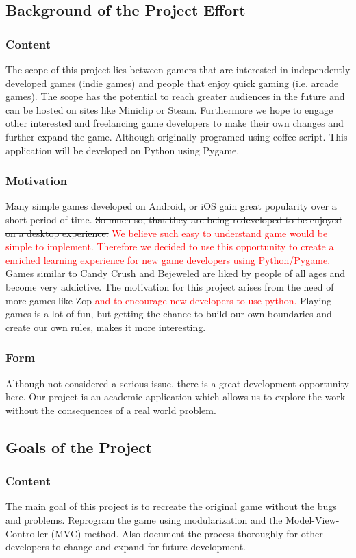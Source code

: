 \documentclass[12pt]{article}
\begin{document}
\subsection{Background of the Project Effort}
\subsubsection{Content}
 The scope of this project lies between gamers that are interested in independently developed games (indie games) and people that enjoy quick gaming (i.e. arcade games). The scope has the potential to reach greater audiences in the future and can be hosted on sites like Miniclip or Steam. Furthermore we hope to engage other interested and freelancing game developers to make their own changes and further expand the game. Although originally programed using coffee script. This application will be developed on Python using Pygame.
\subsubsection{Motivation}
 Many simple games developed on Android, or iOS gain great popularity over a short period of time.\st{ So much so, that they are being redeveloped to be enjoyed on a desktop experience.} \textcolor{red}{ We believe such easy to understand game would be simple to implement.  Therefore we decided to use this opportunity to create a enriched learning experience for new game developers using Python/Pygame.} Games similar to Candy Crush and Bejeweled are liked by people of all ages and become very addictive. The motivation for this project arises from the need of more games like Zop \textcolor{red}{and to encourage new developers to use python.} Playing games is a lot of fun, but getting the chance to build our own boundaries and create our own rules, makes it more interesting.
\subsubsection{Form}
 Although not considered a serious issue, there is a great development opportunity here. Our project is an academic application which allows us to explore the work without the consequences of a real world problem.
\subsection{Goals of the Project}
\subsubsection{Content}
 The main goal of this project is to recreate the original game without the bugs and problems. Reprogram the game using modularization and the Model-View-Controller (MVC) method. Also document the process thoroughly for other developers to change and expand for future development.
\end{document}
